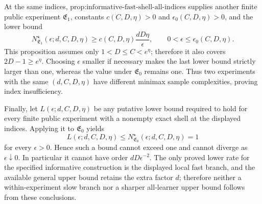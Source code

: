 At the same indices, \(\text{prop:informative-fast-shell-all-indices}\) supplies another finite public experiment \(\mathfrak E_1\), constants \(c(C,D,\eta)>0\) and \(\epsilon_0(C,D,\eta)>0\), and the lower bound
\[
N^\star_{\mathfrak E_1}(\epsilon;d,C,D,\eta)
\ge c(C,D,\eta)\frac{dD\eta}{\epsilon},
\qquad 0<\epsilon\le\epsilon_0(C,D,\eta).
\]
This proposition assumes only \(1<D\le C<e^\eta\); therefore it also covers \(2D-1\ge e^\eta\). Choosing \(\epsilon\) smaller if necessary makes the last lower bound strictly larger than one, whereas the value under \(\mathfrak E_0\) remains one. Thus two experiments with the same \((d,C,D,\eta)\) have different minimax sample complexities, proving index insufficiency.

Finally, let \(L(\epsilon;d,C,D,\eta)\) be any putative lower bound required to hold for every finite public experiment with a nonempty exact shell at the displayed indices. Applying it to \(\mathfrak E_0\) yields
\[
L(\epsilon;d,C,D,\eta)
\le N^\star_{\mathfrak E_0}(\epsilon;d,C,D,\eta)=1
\]
for every \(\epsilon>0\). Hence such a bound cannot exceed one and cannot diverge as \(\epsilon\downarrow0\). In particular it cannot have order \(dD\epsilon^{-2}\). The only proved lower rate for the specified informative construction is the displayed local fast branch, and the available general upper bound retains the extra factor \(d\); therefore neither a within-experiment slow branch nor a sharper all-learner upper bound follows from these conclusions.